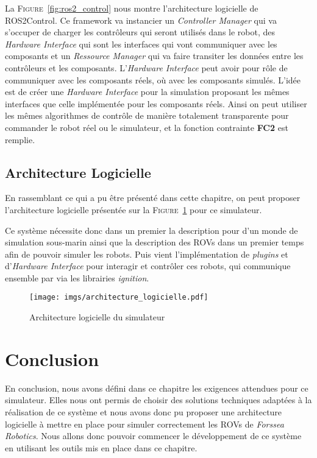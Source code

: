             La \textsc{Figure}~\ref{fig:ros2_control} nous montre l'architecture logicielle de \gls{ROS2Control}. Ce framework va instancier un \textit{Controller Manager} qui va s'occuper de charger les contrôleurs qui seront utilisés dans le robot, des \textit{Hardware Interface} qui sont les interfaces qui vont communiquer avec les composants et un \textit{Ressource Manager} qui va faire transiter les données entre les contrôleurs et les composants. L'\textit{Hardware Interface} peut avoir pour rôle de communiquer avec les composants réels, où avec les composants simulés. L'idée est de créer une \textit{Hardware Interface} pour la simulation proposant les mêmes interfaces que celle implémentée pour les composants réels. Ainsi on peut utiliser les mêmes algorithmes de contrôle de manière totalement transparente pour commander le robot réel ou le simulateur, et la fonction contrainte \textbf{FC2} est remplie.

        \subsection{Architecture Logicielle}

            En rassemblant ce qui a pu être présenté dans cette chapitre, on peut proposer l'architecture logicielle présentée sur la \textsc{Figure}~\ref{fig:architecture_logicielle} pour ce simulateur.
            
            Ce système nécessite donc dans un premier la description pour \gazebo{} d'un monde de simulation sous-marin ainsi que la description des \gls{ROV}s dans un premier temps afin de pouvoir simuler les robots. Puis vient l'implémentation de \textit{plugins} \gazebo{} et d'\textit{Hardware Interface} pour interagir et contrôler ces robots, qui communique ensemble par via les librairies \textit{ignition}.
            
            \begin{figure}[!htb]
                \centering
                \texttt{[image: imgs/architecture\_logicielle.pdf]}
                \caption{Architecture logicielle du simulateur}
                \label{fig:architecture_logicielle}
            \end{figure}

    \section{Conclusion}

        En conclusion, nous avons défini dans ce chapitre les exigences attendues pour ce simulateur. Elles nous ont permis de choisir des solutions techniques adaptées à la réalisation de ce système et nous avons donc pu proposer une architecture logicielle à mettre en place pour simuler correctement les \gls{ROV}s de \textit{Forssea Robotics}. Nous allons donc pouvoir commencer le développement de ce système en utilisant les outils mis en place dans ce chapitre.
        